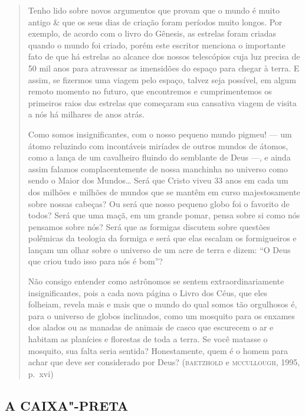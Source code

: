 \begin{quote}
Tenho lido sobre novos argumentos que provam que o mundo é muito antigo \&
que os seus dias de criação foram períodos muito longos. Por exemplo, de
acordo com o livro do Gênesis, as estrelas foram criadas quando o mundo
foi criado, porém este escritor menciona o importante fato de que há
estrelas ao alcance dos nossos telescópios cuja luz precisa de 50 mil anos
para atravessar as imensidões do espaço para chegar à terra. E assim, se
fizermos uma viagem pelo espaço, talvez seja possível, em algum remoto
momento no futuro, que encontremos e cumprimentemos os primeiros raios das
estrelas que começaram sua cansativa viagem de visita a nós há milhares de
anos atrás.

Como somos insignificantes, com o nosso pequeno mundo pigmeu! --- um átomo
reluzindo com incontáveis miríades de outros mundos de átomos, como a lança
de um cavalheiro fluindo do semblante de Deus ---, e ainda assim falamos
complacentemente de nossa manchinha no universo como sendo o Maior dos
Mundos\ldots{} Será que Cristo viveu 33 anos em cada um dos milhões e milhões
de mundos que se mantêm em curso majestosamente sobre nossas cabeças? Ou
será que nosso pequeno globo foi o favorito de todos? Será que uma maçã,
em um grande pomar, pensa sobre si como nós pensamos sobre nós? Será que
as formigas discutem sobre questões polêmicas da teologia da formiga e
será que elas escalam os formigueiros e lançam um olhar sobre o universo
de um acre de terra e dizem: “O Deus que criou tudo isso para nós é bom”?

Não consigo entender como astrônomos se sentem extraordinariamente
insignificantes, pois a cada nova página o Livro dos Céus, que eles
folheiam, revela mais e mais que o mundo do qual somos tão
orgulhosos é, para o universo de globos inclinados, como um mosquito
para os enxames dos alados ou as manadas de animais de casco que
escurecem o ar e habitam as planícies e florestas de toda a terra. Se você
matasse o mosquito, sua falta seria sentida? Honestamente, quem é o
homem para achar que deve ser considerado por Deus? (\textsc{baetzhold} e
\textsc{mccullough}, 1995, p.~xvi)
\end{quote}

\subsection{A CAIXA"-PRETA}

